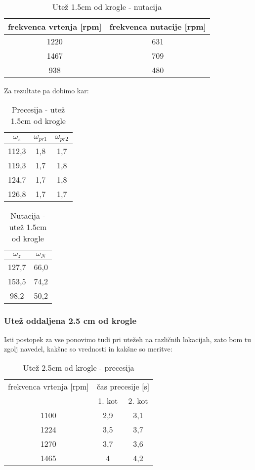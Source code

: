 \documentclass[11pt, a4paper]{article}
\theoremstyle{definition}
\theoremstyle{example}
\theoremstyle{izrek}
\begin{document}
\begin{table}[h]
	\centering
	\begin{tabular}{|c|c|}
		\hline
		frekvenca vrtenja [rpm] & frekvenca nutacije [rpm]\\
		\hline
		\hline
		1220 &	631\\
		\hline
		1467 &	709\\
		\hline
		938	& 	480\\
		\hline
	\end{tabular}
	\caption{Utež 1.5cm od krogle - nutacija}
\end{table}
Za rezultate pa dobimo kar: \\

\begin{table}[h]
	\centering
	\begin{tabular}{|c|c|c|}
		\hline
		\rule{0pt}{3ex}   
		$\omega_z$ & $\omega_{pr1}$\: & $\omega_{pr2}$\\
		\hline
		\hline
		112,3 &	1,8 &	1,7 \\
		\hline
		119,3 &	1,7 &	1,8 \\
		\hline
		124,7 &	1,7 &	1,8 \\
		\hline
		126,8 &	1,7 &	1,7 \\
		\hline
	\end{tabular}
	\caption{Precesija - utež 1.5cm od krogle}
\end{table}

\begin{table}[hbt!]
	\centering
	\begin{tabular}{|c|c|}
		\hline
		\rule{0pt}{3ex}   
		$\omega_z$ & $\omega_{N}$ \\
		\hline
		\hline
		127,7 &	66,0 \\
		\hline
		153,5 &	74,2 \\
		\hline
		98,2 &	50,2 \\
		\hline
	\end{tabular}
	\caption{Nutacija - utež 1.5cm od krogle}
\end{table}


\pagebreak

\subsubsection{Utež oddaljena 2.5 cm od krogle}
Isti postopek za vse ponovimo tudi pri utežeh na različnih lokacijah, zato bom tu zgolj navedel, kakšne so vrednosti in kakšne so meritve: \\
\begin{table}[h]
	\centering
	\begin{tabular}{|c|c c|}
		\hline
		frekvenca vrtenja [rpm] & \multicolumn{2}{|c|}{čas precesije [s]} \\
		& 1. kot & 2. kot \\
		\hline
		\hline
		1100 &	2,9 &	3,1\\
		\hline
		1224 &	3,5 &	3,7\\
		\hline
		1270 &	3,7 &	3,6\\
		\hline
		1465 &	4 &		4,2\\
		\hline
	\end{tabular}
	\caption{Utež 2.5cm od krogle - precesija}
\end{table}
\end{document}
